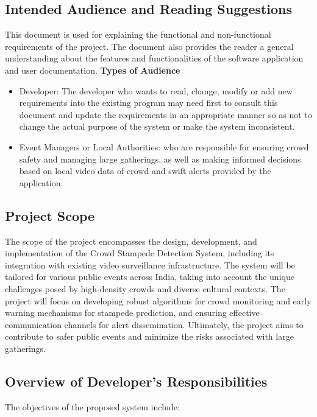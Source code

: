 \documentclass[11pt]{report}
\begin{document}
\subsection{Intended Audience and Reading Suggestions}
This document is used for explaining the functional and non-functional requirements of the project. The document also provides the reader a general understanding about the features and functionalities of the software application and user documentation.
 \newline
 \textbf{Types of Audience}
\begin{itemize}
    \item Developer: The developer who wants to read, change, modify or add new requirements into the existing program may need first to consult this document and update the requirements in an appropriate manner so as not to change the actual purpose of the system or make the system inconsistent.
    \item Event Managers or Local Authorities: who are responsible for ensuring crowd safety and managing large gatherings, as well as making informed decisions based on  local video data of crowd  and swift alerts provided by the application.
\end{itemize}

\subsection{Project Scope}

The scope of the project encompasses the design, development, and implementation of the Crowd Stampede Detection System, including its integration with existing video surveillance infrastructure. The system will be tailored for various public events across India, taking into account the unique challenges posed by high-density crowds and diverse cultural contexts. The project will focus on developing robust algorithms for  crowd monitoring and early warning mechanisms for stampede prediction, and ensuring effective communication channels for alert dissemination. Ultimately, the project aims to contribute to safer public events and minimize the risks associated with large gatherings. 
\subsection{Overview of Developer’s Responsibilities}
The objectives of the proposed system include:
\end{document}
